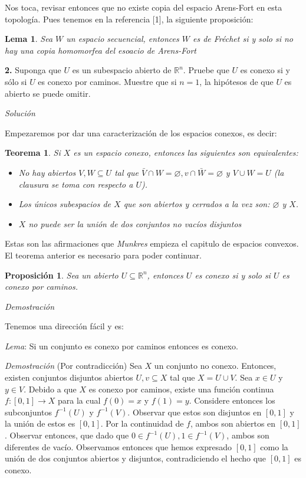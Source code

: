 \documentclass[]{article}
\newtheorem{thm}{Teorema}
\newtheorem{prop}{Proposición}
\newtheorem{lem}{Lema}
\newcommand{\RR}{\mathbb{R}}
\newcommand{\function}[3]{#1 : #2 \rightarrow #3}
\newcommand{\contained}{\subseteq}
\begin{document}
Nos toca, revisar entonces que no existe copia del espacio Arens-Fort en esta topología. Pues tenemos en la referencia [1], la siguiente proposición:

\begin{lem}
	Sea $W$ un espacio secuencial, entonces $ W $ es de Fréchet si y solo si no hay una copia homomorfea del esoacio de Arens-Fort
\end{lem}





\textbf{2.} Suponga que $ U $ es un subespacio abierto de $ \RR^n $. Pruebe que $ U  $ es conexo si y sólo si $ U $ es conexo por caminos. Muestre que si $ n=1 $, la hipótesos de que $ U $ es abierto se puede omitir.

\textit{Solución}

Empezaremos por dar una caracterización de los espacios conexos, es decir:

\begin{thm}
	Si $X$ es un espacio conexo, entonces las siguientes son equivalentes:
	\begin{itemize}
		\item No hay abiertos $ V,W \contained U $ tal que $ \bar{V} \cap W = \varnothing, v \cap \bar{W} = \varnothing $ y $ V \cup W = U$ (la clausura se toma con respecto a $ U $).
		\item Los únicos subespacios de $X$ que son abiertos y cerrados a la vez son: $ \varnothing $ y $ X $.
		\item $X$ no puede ser la unión de dos conjuntos no vacíos disjuntos 
	\end{itemize}
\end{thm}

Estas son las afirmaciones que \emph{Munkres} empieza el capitulo de espacios convexos. El teorema anterior es necesario para poder continuar.

\begin{prop}
	Sea un abierto $ U \contained \RR^n $, entonces $ U  $ es conexo si y solo si $ U $ es conexo por caminos.
\end{prop} 

\textit{Demostración}

Tenemos una dirección fácil y es:

\textit{Lema}: Si un conjunto es conexo por caminos entonces es conexo.

\textit{Demostración}  (Por contradicción) Sea $X$ un conjunto no conexo. Entonces, existen conjuntos disjuntos abiertos $ U,v \contained X $ tal que $ X = U \cup V $. Sea $ x \in U $ y $ y \in V $. Debido a que $ X $ es conexo por caminos, existe una función continua $ \function{f}{[0,1]}{X} $ para la cual $ f(0) = x $ y $ f(1) = y $. Considere entonces los subconjuntos $ f^{-1}(U) $ y $ f^{-1}(V) $. Observar que estos son disjuntos en $ [0,1] $ y la unión de estos es $ [0,1] $. Por la continuidad de $f$, ambos son abiertos en $ [0,1] $. Observar entonces, que dado que $ 0 \in f^{-1}(U),  1 \in f^{-1}(V)$, ambos son diferentes de vacío. Observamos entonces que hemos expresado $ [0,1] $ como la unión de dos conjuntos abiertos y disjuntos, contradiciendo el hecho que $ [0,1] $ es conexo. \qedsymbol
\end{document}
